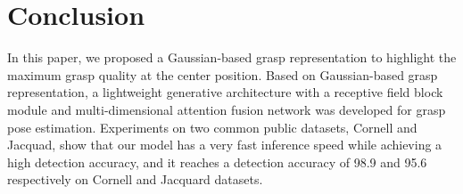 \documentclass[journal]{IEEEtran}
\begin{document}
\section{Conclusion}

In this paper, we proposed a Gaussian-based grasp representation to highlight the maximum grasp quality at the center position. Based on Gaussian-based grasp representation, a lightweight generative architecture with a receptive field block module and multi-dimensional attention fusion network was developed for grasp pose estimation. Experiments on two common public datasets, Cornell and Jacquad, show that our model has a very fast inference speed while achieving a high detection accuracy, and it reaches a detection accuracy of 98.9 and 95.6 respectively on Cornell and Jacquard datasets.







\end{document}
